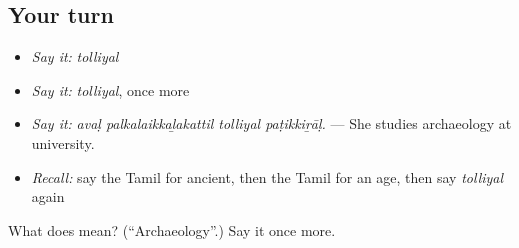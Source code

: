 \subsection*{Your turn}
\begin{itemize}
\raggedright
  \item \emph{Say it:} \emph{tolliyal}
  \item \emph{Say it:} \emph{tolliyal}, once more
  \item \emph{Say it:} \emph{avaḷ palkalaikkaḻakattil tolliyal paṭikkiṟāḷ.} — She studies archaeology at university.
  \item \emph{Recall:} say the Tamil for ancient, then the Tamil for an age, then say \emph{tolliyal} again
\end{itemize}

\begin{tcolorbox}[breakable,colback=teal!4,colframe=teal!35!black,title={Before you move on}]
What does  mean? (\textquotedblleft{}Archaeology\textquotedblright{}.) Say it once more.
\end{tcolorbox}
